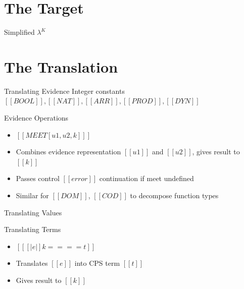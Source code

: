 \documentclass[10pt]{beamer}
\begin{document}
\section{The Target}

\begin{frame}{Simplified $\lambda^K$}

  \begin{minipage}{0.45\textwidth}
  \end{minipage}
  \begin{minipage}{0.45\textwidth}
  \end{minipage}
\end{frame}


\section{The Translation}
\begin{frame}{Translating Evidence}
  Integer constants $[[BOOL]],[[NAT]],[[ARR]],[[PROD]],[[DYN]]$

  \ottdefnEvTransform{}
\end{frame}

\begin{frame}{Evidence Operations}
  \begin{itemize}
    \item $[[MEET[u1, u2, k] ]]$
    \item Combines evidence representation $[[u1]]$ and $[[u2]]$, gives result to $[[k]]$
    \item Passes control $[[error]]$ continuation if meet undefined
    \item Similar for $[[DOM]]$, $[[COD]]$ to decompose function types
  \end{itemize}
\end{frame}

\begin{frame}{Translating Values}

  \ottdefnValTransform{} 
\end{frame}

\begin{frame}{Translating Terms}

  \begin{itemize}
    \item $[[ [|e|]k ==== t ]]$
    \item Translates $[[e]]$ into CPS term $[[t]]$
    \item Gives result to $[[k]]$  
  \end{itemize}
\end{frame}
\end{document}
